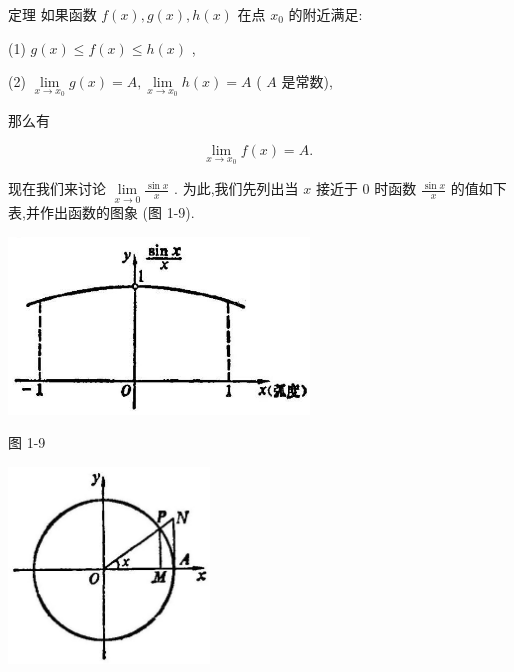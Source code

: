 \documentclass[lang=cn,newtx,10pt,scheme=chinese]{elegantbook}
\begin{document}
定理 如果函数 \(f\left( x\right) ,g\left( x\right) ,h\left( x\right)\) 在点 \({x}_{0}\) 的附近满足:

(1) \(g\left( x\right) \leq f\left( x\right) \leq h\left( x\right)\) ,

(2) \(\mathop{\lim }\limits_{{x \rightarrow {x}_{0}}}g\left( x\right) = A,\mathop{\lim }\limits_{{x \rightarrow {x}_{0}}}h\left( x\right) = A\) ( \(A\) 是常数),

那么有

\[
\mathop{\lim }\limits_{{x \rightarrow {x}_{0}}}f\left( x\right) = A\text{. }
\]

现在我们来讨论 \(\mathop{\lim }\limits_{{x \rightarrow 0}}\frac{\sin x}{x}\) . 为此,我们先列出当 \(x\) 接近于 0 时函数 \(\frac{\sin x}{x}\) 的值如下表,并作出函数的图象 (图 1-9).

\begin{center}
\end{center}

\begin{center}
	\includegraphics[max width=0.6\textwidth]{images/01912c18-5c3f-733d-b775-749ba9897a9d_42_483969.jpg}
\end{center}

图 1-9

\begin{center}
	\includegraphics[max width=0.4\textwidth]{images/01912c18-5c3f-733d-b775-749ba9897a9d_42_838953.jpg}
\end{center}
\end{document}
